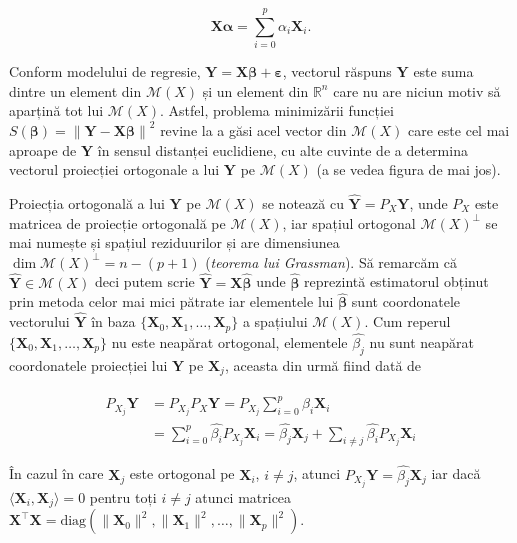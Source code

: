\documentclass[]{article}
\begin{document}
\[
  \boldsymbol X \boldsymbol\alpha = \sum_{i = 0}^{p}\alpha_i \boldsymbol X_i.
\]

Conform modelului de regresie,
\(\boldsymbol Y = \boldsymbol X\boldsymbol \beta + \boldsymbol \varepsilon\),
vectorul răspuns \(\boldsymbol Y\) este suma dintre un element din
\(\mathcal{M}(X)\) și un element din \(\mathbb{R}^n\) care nu are niciun
motiv să aparțină tot lui \(\mathcal{M}(X)\). Astfel, problema
minimizării funcției
\(S(\boldsymbol \beta) = \left\lVert \boldsymbol Y - \boldsymbol X \boldsymbol\beta\right\rVert^2\)
revine la a găsi acel vector din \(\mathcal{M}(X)\) care este cel mai
aproape de \(\boldsymbol Y\) în sensul distanței euclidiene, cu alte
cuvinte de a determina vectorul proiecției ortogonale a lui
\(\boldsymbol Y\) pe \(\mathcal{M}(X)\) (a se vedea figura de mai jos).

Proiecția ortogonală a lui \(\boldsymbol Y\) pe \(\mathcal{M}(X)\) se
notează cu \(\hat{\boldsymbol Y} = P_X \boldsymbol Y\), unde \(P_X\)
este matricea de proiecție ortogonală pe \(\mathcal{M}(X)\), iar spațiul
ortogonal \(\mathcal{M}(X)^\perp\) se mai numește și spațiul
reziduurilor și are dimensiunea
\(\dim \mathcal{M}(X)^\perp = n - (p+1)\) (\emph{teorema lui Grassman}).
Să remarcăm că \(\hat{\boldsymbol Y}\in\mathcal{M}(X)\) deci putem scrie
\(\hat{\boldsymbol Y} = \boldsymbol X\hat{\boldsymbol \beta}\) unde
\(\hat{\boldsymbol \beta}\) reprezintă estimatorul obținut prin metoda
celor mai mici pătrate iar elementele lui \(\hat{\boldsymbol \beta}\)
sunt coordonatele vectorului \(\hat{\boldsymbol Y}\) în baza
\(\{\boldsymbol X_0, \boldsymbol X_1,\ldots, \boldsymbol X_p\}\) a
spațiului \(\mathcal{M}(X)\). Cum reperul
\(\{\boldsymbol X_0, \boldsymbol X_1,\ldots, \boldsymbol X_p\}\) nu este
neapărat ortogonal, elementele \(\hat{\beta_j}\) nu sunt neapărat
coordonatele proiecției lui \(\boldsymbol Y\) pe \(\boldsymbol X_j\),
aceasta din urmă fiind dată de

\begin{align*}
  P_{X_j}\boldsymbol Y &= P_{X_j}P_X \boldsymbol Y = P_{X_j}\sum_{i = 0}^{p} \hat{\beta_i}\boldsymbol X_i\\
    &= \sum_{i = 0}^{p}\hat{\beta_i} P_{X_j}\boldsymbol X_i = \hat{\beta_j} \boldsymbol X_j + \sum_{i \neq j}\hat{\beta_i} P_{X_j}\boldsymbol X_i
\end{align*}

În cazul în care \(\boldsymbol X_j\) este ortogonal pe
\(\boldsymbol X_i\), \(i\neq j\), atunci
\(P_{X_j}\boldsymbol Y = \hat{\beta_j} \boldsymbol X_j\) iar dacă
\(\langle\boldsymbol X_i, \boldsymbol X_j\rangle = 0\) pentru toți
\(i\neq j\) atunci matricea
\(\boldsymbol X^\intercal\boldsymbol X = \mathrm{diag}\left(\lVert\boldsymbol X_0\rVert^2, \lVert\boldsymbol X_1\rVert^2, \ldots, \lVert\boldsymbol X_p\rVert^2\right)\).
\end{document}
